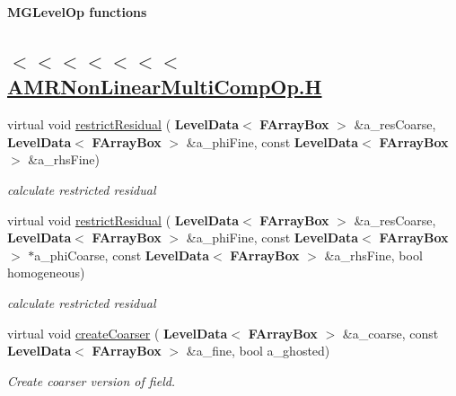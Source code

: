 \begin{Indent}\textbf{ M\+G\+Level\+Op functions}\par
{\em \subsection*{$<$$<$$<$$<$$<$$<$$<$ \hyperlink{_a_m_r_non_linear_multi_comp_op_8_h_source}{A\+M\+R\+Non\+Linear\+Multi\+Comp\+Op.\+H} }}\begin{DoxyCompactItemize}
\item 
virtual void \hyperlink{class_a_m_r_non_linear_multi_comp_op_ad0f58cb65ab237d61874f2aeae1a4da3}{restrict\+Residual} (\textbf{ Level\+Data}$<$ \textbf{ F\+Array\+Box} $>$ \&a\+\_\+res\+Coarse, \textbf{ Level\+Data}$<$ \textbf{ F\+Array\+Box} $>$ \&a\+\_\+phi\+Fine, const \textbf{ Level\+Data}$<$ \textbf{ F\+Array\+Box} $>$ \&a\+\_\+rhs\+Fine)
\begin{DoxyCompactList}\small\item\em calculate restricted residual \end{DoxyCompactList}\item 
\mbox{\label{class_a_m_r_non_linear_multi_comp_op_a65b95bc4127ffdfab47bd5a81acf2772}} 
virtual void \hyperlink{class_a_m_r_non_linear_multi_comp_op_a65b95bc4127ffdfab47bd5a81acf2772}{restrict\+Residual} (\textbf{ Level\+Data}$<$ \textbf{ F\+Array\+Box} $>$ \&a\+\_\+res\+Coarse, \textbf{ Level\+Data}$<$ \textbf{ F\+Array\+Box} $>$ \&a\+\_\+phi\+Fine, const \textbf{ Level\+Data}$<$ \textbf{ F\+Array\+Box} $>$ $\ast$a\+\_\+phi\+Coarse, const \textbf{ Level\+Data}$<$ \textbf{ F\+Array\+Box} $>$ \&a\+\_\+rhs\+Fine, bool homogeneous)
\begin{DoxyCompactList}\small\item\em calculate restricted residual \end{DoxyCompactList}\item 
\mbox{\label{class_a_m_r_non_linear_multi_comp_op_ac3ea29dd436c89aafde25c8f33fdb30d}} 
virtual void \hyperlink{class_a_m_r_non_linear_multi_comp_op_ac3ea29dd436c89aafde25c8f33fdb30d}{create\+Coarser} (\textbf{ Level\+Data}$<$ \textbf{ F\+Array\+Box} $>$ \&a\+\_\+coarse, const \textbf{ Level\+Data}$<$ \textbf{ F\+Array\+Box} $>$ \&a\+\_\+fine, bool a\+\_\+ghosted)
\begin{DoxyCompactList}\small\item\em Create coarser version of field. \end{DoxyCompactList}\item 

\end{DoxyCompactItemize}
\end{Indent}
